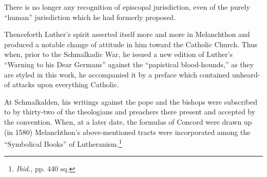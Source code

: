There is no longer any recognition of episcopal jurisdiction, even of
the purely “human” jurisdiction which he had formerly proposed.

Thenceforth Luther’s spirit asserted itself more and more in Melanchthon
and produced a notable change of attitude in him toward
the Catholic Church. Thus when, prior to the Schmalkadic War, he
issued a new edition of Luther’s “Warning to his Dear Germans”
against the “papistical blood-hounds,” as they are styled in this work,
he accompanied it by a preface which contained unheard-of attacks
upon everything Catholic.

At Schmalkalden, his writings against the pope and the bishops
were subscribed to by thirty-two of the theologians and preachers
there present and accepted by the convention. When, at a later date,
the formulas of Concord were drawn up (in 1580) Melanchthon’s
above-mentioned tracts were incorporated among the “Symbolical
Books” of Lutheranism.\footnote{\textit{Ibid.}, pp. 440 sq.}
